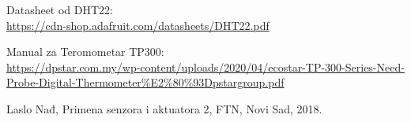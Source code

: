 \documentclass[a4paper, 12pt]{article}
\begin{document}
\begin{enumerate}[label={[\arabic*]}, leftmargin=2.5cm]
	\item Datasheet od DHT22: \label{lib:DHT22-datasheet}\\ \url{https://cdn-shop.adafruit.com/datasheets/DHT22.pdf}
	\sloppypar
	\item Manual za Teromometar TP300: \label{lib:TP300}\\ \url{https://dpstar.com.my/wp-content/uploads/2020/04/ecostar-TP-300-Series-Need-Probe-Digital-Thermometer\%E2\%80\%93Dpstargroup.pdf}	
	\item Laslo Nađ, Primena senzora i aktuatora 2, FTN, Novi Sad, 2018.
\end{enumerate}
\renewcommand{\theenumi}{\arabic{enumi}}

\pagebreak
\endgroup
\end{document}
